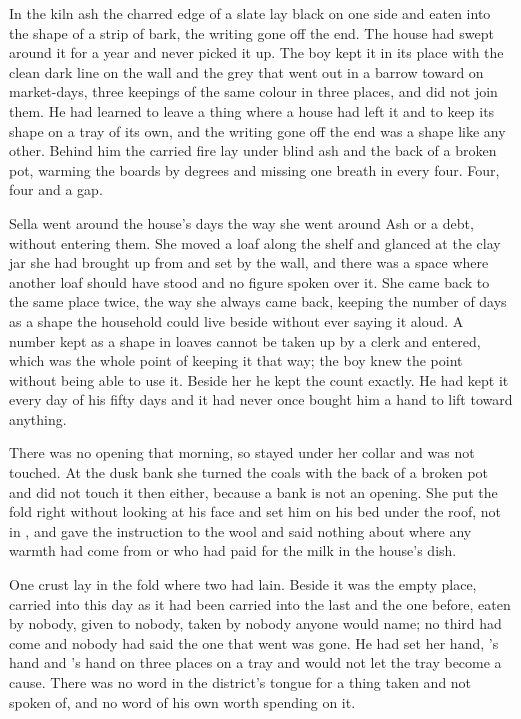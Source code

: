 In the kiln ash the charred edge of a slate lay black on one side and eaten into the shape of a strip of bark, the writing gone off the end. The house had swept around it for a year and never picked it up. The boy kept it in its place with the clean dark line on the wall and the grey that went out in a barrow toward  on market-days, three keepings of the same colour in three places, and did not join them. He had learned to leave a thing where a house had left it and to keep its shape on a tray of its own, and the writing gone off the end was a shape like any other. Behind him the carried fire lay under blind ash and the back of a broken pot, warming the boards by degrees and missing one breath in every four. Four, four and a gap.

\scenebreak

Sella went around the house's days the way she went around Ash or a debt, without entering them. She moved a loaf along the shelf and glanced at the clay jar she had brought up from  and set by the wall, and there was a space where another loaf should have stood and no figure spoken over it. She came back to the same place twice, the way she always came back, keeping the number of days as a shape the household could live beside without ever saying it aloud. A number kept as a shape in loaves cannot be taken up by a clerk and entered, which was the whole point of keeping it that way; the boy knew the point without being able to use it. Beside her he kept the count exactly. He had kept it every day of his fifty days and it had never once bought him a hand to lift toward anything.

There was no opening that morning, so  stayed under her collar and was not touched. At the dusk bank she turned the coals with the back of a broken pot and did not touch it then either, because a bank is not an opening. She put the fold right without looking at his face and set him on his bed under the roof, not in , and gave the instruction to the wool and said nothing about where any warmth had come from or who had paid for the milk in the house's dish.

One crust lay in the fold where two had lain. Beside it was the empty place, carried into this day as it had been carried into the last and the one before, eaten by nobody, given to nobody, taken by nobody anyone would name; no third had come and nobody had said the one that went was gone. He had set her hand, 's hand and 's hand on three places on a tray and would not let the tray become a cause. There was no word in the district's tongue for a thing taken and not spoken of, and no word of his own worth spending on it.

